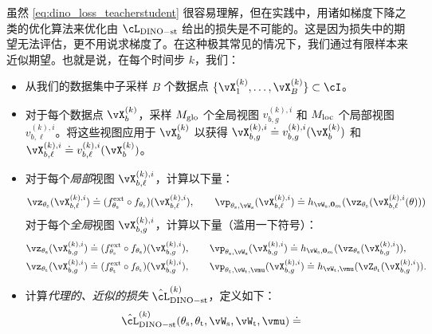 \documentclass[../../book-main.tex]{subfiles}
\begin{document}
虽然 \eqref{eq:dino_loss_teacherstudent} 很容易理解，但在实践中，用诸如梯度下降之类的优化算法来优化由 \(\cL_{\dino{}-\student\teacher}\) 给出的损失是不可能的。这是因为损失中的期望无法评估，更不用说求梯度了。在这种极其常见的情况下，我们通过有限样本来近似期望。也就是说，在每个时间步 \(k\)，我们：
\begin{itemize}
    \item 从我们的数据集中子采样 \(B\) 个数据点 \(\{\vX_{1}^{(k)}, \dots, \vX_{B}^{(k)}\} \subset \cI\)。
    \item 对于每个数据点 \(\vX_{b}^{(k)}\)，采样 \(M_{\mathrm{glo}}\) 个全局视图 \(v_{b, g}^{(k), i}\) 和 \(M_{\mathrm{loc}}\) 个局部视图 \(v_{b, \ell}^{(k), i}\)。将这些视图应用于 \(\vX_{b}^{(k)}\) 以获得 \(\vX_{b, g}^{(k), i} \doteq v_{b, g}^{(k), i}(\vX_{b}^{(k)})\) 和 \(\vX_{b, \ell}^{(k), i} \doteq v_{b, \ell}^{(k), i}(\vX_{b}^{(k)})\)。
    \item 对于每个\textit{局部}视图 \(\vX_{b, \ell}^{(k), i}\)，计算以下量：
    \begin{equation}
        \vz_{\theta_{\student}}(\vX_{b, \ell}^{(k), i}) \doteq (f_{\theta_{\student}}^{\ext} \circ f_{\theta_{\student}})(\vX_{b, \ell}^{(k), i}), \qquad \vp_{\theta_{\student}, \vW_{\student}}(\vX_{b, \ell}^{(k), i}) \doteq h_{\vW_{\student}, \vzero_{m}}(\vz_{\theta_{\student}}(\vX_{b, \ell}^{(k), i}(\theta)))
    \end{equation}
    对于每个\textit{全局}视图 \(\vX_{b, g}^{(k), i}\)，计算以下量（滥用一下符号）：
    \begin{align}
        &\vz_{\theta_{\student}}(\vX_{b, g}^{(k), i}) \doteq (f_{\theta_{\student}}^{\ext} \circ f_{\theta_{\student}})(\vX_{b, g}^{(k), i}), \qquad \vp_{\theta_{\student}, \vW_{\student}}(\vX_{b, g}^{(k), i}) \doteq h_{\vW_{\student}, \vzero_{m}}(\vz_{\theta_{\student}}(\vX_{b, g}^{(k), i})), \\
        &\vz_{\theta_{\teacher}}(\vX_{b, g}^{(k), i}) \doteq (f_{\theta_{\teacher}}^{\ext} \circ f_{\theta_{\teacher}})(\vX_{b, g}^{(k), i}), \qquad \vp_{\theta_{\teacher}, \vW_{\teacher}, \vmu}(\vX_{b, g}^{(k), i}) \doteq h_{\vW_{\teacher}, \vmu}(\vZ_{\theta_{\teacher}}(\vX_{b, g}^{(k), i})).
    \end{align}
    \item 计算\textit{代理的、近似的损失} \(\hat{\cL}_{\dino-\student\teacher}^{(k)}\)，定义如下：
    \begin{align}\label{eq:dino_loss_teacherstudent_empirical}
        &\hat{\cL}_{\dino{}-\student\teacher}^{(k)}(\theta_{\student}, \theta_{\teacher}, \vW_{\student}, \vW_{\teacher}, \vmu) \doteq

\end{align}
\end{itemize}
\end{document}
